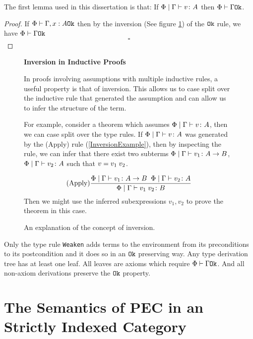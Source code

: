 \documentclass{Report}
\begin{document}
\begin{lemma}[Ok Lemma]
    The first lemma used in this dissertation is that: If $\Phi\mid\Gamma \vdash v \colon A$ then $\Phi\vdash \Gamma \texttt{Ok}$.
\end{lemma}
\begin{proof}
    If $\Phi\vdash \Gamma, x: A \texttt{Ok}$ then by the inversion (See figure \ref{InversionPrinciple}) of the $\texttt{Ok}$ rule, we have $\Phi\vdash \Gamma \texttt{Ok}$ 
    $$\square$$
\end{proof}


\begin{figure}
    \begin{framed}
        \textbf{Inversion in Inductive Proofs}

        In proofs involving assumptions with multiple inductive rules, a useful property is that of inversion. This allows us to case split over the inductive rule that generated the assumption and can allow us to infer the structure of the term.

        For example, consider a theorem which assumes $\Phi\mid\Gamma \vdash v \colon A$, then we can case split over the type rules. If $\Phi\mid\Gamma \vdash v \colon A$ was generated by the (Apply) rule (\ref{InversionExample}), then by inspecting the rule, we can infer that there exist two subterms $\Phi\mid\Gamma \vdash v_1 \colon A\rightarrow B$, $\Phi\mid\Gamma \vdash v_2 \colon A$ such that $v = v_1\; v_2$. 

        \begin{equation}\label{InversionExample}
            (\text{Apply}) \frac{\Phi\mid\Gamma \vdash v_1 \colon A\rightarrow B\;\;\Phi\mid\Gamma \vdash v_2 \colon A}{\Phi\mid\Gamma \vdash v_1\; v_2 \colon B}
        \end{equation}
        Then we might use the inferred subexpressions $v_1, v_2$ to prove the theorem in this case.
    \end{framed}
    \caption{An explanation of the concept of inversion.}
    \label{InversionPrinciple}
\end{figure}


Only the type rule \texttt{Weaken} adds terms to the environment from its preconditions to its postcondition and it does so in an $\texttt{Ok}$ preserving way. Any type derivation tree has at least one leaf. All leaves are axioms which require $\Phi\vdash \Gamma \texttt{Ok}$. And all non-axiom derivations preserve the $\texttt{Ok}$ property.


\chapter{The Semantics of PEC in an Strictly Indexed Category}
\end{document}
